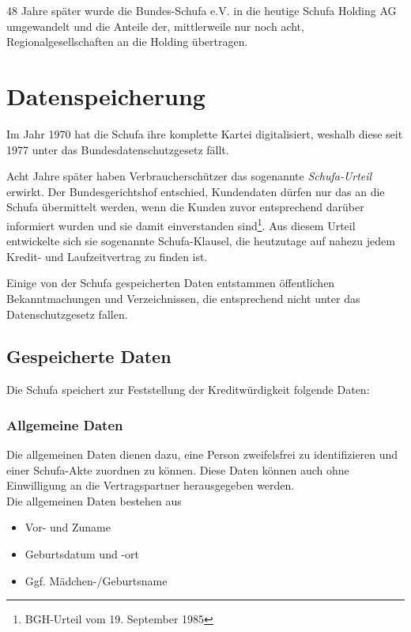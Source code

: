 \documentclass[12pt]{article}
\begin{document}
48 Jahre später wurde die Bundes-Schufa e.V. in die heutige Schufa Holding AG umgewandelt und die Anteile der, mittlerweile nur noch acht, Regionalgesellschaften an die Holding übertragen.






\section{Datenspeicherung}
\label{sec:datenspeicherung}
Im Jahr 1970 hat die Schufa ihre komplette Kartei digitalisiert, weshalb diese seit 1977 unter das Bundesdatenschutzgesetz fällt.

Acht Jahre später haben Verbraucherschützer das sogenannte \textit{Schufa-Urteil} erwirkt. Der Bundesgerichtshof entschied, Kundendaten dürfen nur das an die Schufa übermittelt werden, wenn die 
Kunden zuvor entsprechend darüber informiert wurden und sie damit einverstanden sind\footnote{BGH-Urteil vom 19. September 1985}. Aus diesem Urteil entwickelte sich sie sogenannte Schufa-Klausel,
die heutzutage auf nahezu jedem Kredit- und Laufzeitvertrag zu finden ist.

Einige von der Schufa gespeicherten Daten entstammen öffentlichen Bekanntmachungen und Verzeichnissen, die entsprechend nicht unter das Datenschutzgesetz fallen.



\subsection{Gespeicherte Daten}
\label{subsec:gespeicherte-daten}
Die Schufa speichert zur Feststellung der Kreditwürdigkeit folgende Daten:

\subsubsection*{Allgemeine Daten}
Die allgemeinen Daten dienen dazu, eine Person zweifelsfrei zu identifizieren und einer Schufa-Akte zuordnen zu können. Diese Daten können auch ohne Einwilligung an die Vertragspartner herausgegeben 
werden.\\

Die allgemeinen Daten bestehen aus
\begin{itemize}
\item Vor- und Zuname
\item Geburtsdatum und -ort
\item Ggf. Mädchen-/Geburtsname
\end{itemize}
\end{document}
